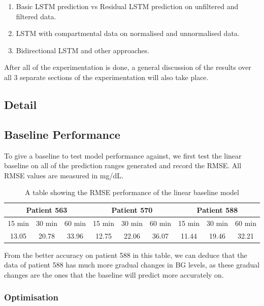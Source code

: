       \begin{enumerate}
        \item Basic LSTM prediction vs Residual LSTM prediction on unfiltered and filtered data.
        \item LSTM with compartmental data on normalised and unnormalised data.
        \item Bidirectional LSTM and other approaches.

      \end{enumerate}
	
      After all of the experimentation is done, a general discussion of the results over all 3 separate sections of the experimentation will also take place.

	\subsection{Detail}
    
    \subsection{Baseline Performance}

      To give a baseline to test model performance against, we first test the linear baseline on all of the prediction ranges generated and record the RMSE. All RMSE values are measured in mg/dL.

      \begin{table}[H]
        \centering
        \caption{A table showing the RMSE performance of the linear baseline model}
        \begin{tabular}{|*{9}{c|}} 
          \hline
          \multicolumn{3}{|c}{Patient 563} & \multicolumn{3}{|c}{Patient 570} & \multicolumn{3}{|c|}{Patient 588} \\ \hline 
          15 min & 30 min & 60 min &15 min & 30 min & 60 min &15 min & 30 min & 60 min \\ \hline
          13.05&20.78 &33.96 &12.75&22.06 &36.07 &11.44 &19.46 &32.21 \\ \hline
        \end{tabular}
      \end{table}

      From the better accuracy on patient 588 in this table, we can deduce that the data of patient 588 has much more gradual changes in BG levels, as these gradual changes are the ones that the baseline will predict more accurately on.

    \subsubsection{Optimisation}

